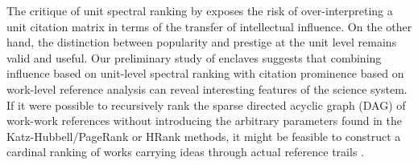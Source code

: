 The critique of unit spectral ranking by \textcite{vaccarioWhenStandardNetwork2022} exposes the risk of over-interpreting a unit citation matrix in terms of the transfer of intellectual influence. On the other hand, the distinction between popularity and prestige at the unit level \citep{bollenJournalStatus2006} remains valid and useful. Our preliminary study of enclaves suggests that combining influence based on unit-level spectral ranking with citation prominence based on work-level reference analysis can reveal interesting features of the science system.  If it were possible to recursively rank the sparse directed acyclic graph (DAG) of work-work references without introducing the arbitrary parameters found in the Katz-Hubbell/PageRank or HRank \citep{caoRankingAcademicInstitutions2023} methods, it might be feasible to construct a cardinal ranking of works carrying ideas through actual reference trails \citep[see also][]{golosovskyCitationAnalysisDynamics2019}.

